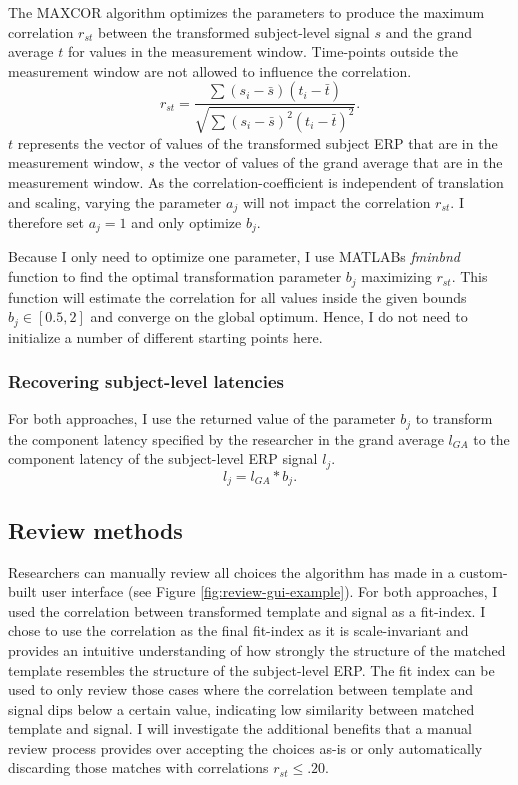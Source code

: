 \documentclass[
  man]{apa7}
\begin{document}
The MAXCOR algorithm optimizes the parameters to produce the maximum correlation \(r_{st}\) between the transformed subject-level signal \(s\) and the grand average \(t\) for values in the measurement window. Time-points outside the measurement window are not allowed to influence the correlation.
\[r_{st} = \frac{\sum(s_i - \bar{s})(t_{i} - \bar{t})}{\sqrt{\sum(s_i - \bar{s})^2(t_{i} - \bar{t})^2}}.\]
\(t\) represents the vector of values of the transformed subject ERP that are in the measurement window, \(s\) the vector of values of the grand average that are in the measurement window. As the correlation-coefficient is independent of translation and scaling, varying the parameter \(a_j\) will not impact the correlation \(r_{st}\). I therefore set \(a_j = 1\) and only optimize \(b_j\).

Because I only need to optimize one parameter, I use MATLABs \emph{fminbnd} function to find the optimal transformation parameter \(b_j\) maximizing \(r_{st}\). This function will estimate the correlation for all values inside the given bounds \(b_j \in [0.5, 2]\) and converge on the global optimum. Hence, I do not need to initialize a number of different starting points here.

\hypertarget{recovering-subject-level-latencies}{%
\subsubsection{Recovering subject-level latencies}\label{recovering-subject-level-latencies}}

For both approaches, I use the returned value of the parameter \(b_j\) to transform the component latency specified by the researcher in the grand average \(l_{GA}\) to the component latency of the subject-level ERP signal \(l_j\).
\[ l_j = l_{GA} * b_j.\]

\hypertarget{review-methods}{%
\subsection{Review methods}\label{review-methods}}

Researchers can manually review all choices the algorithm has made in a custom-built user interface (see Figure \ref{fig:review-gui-example}). For both approaches, I used the correlation between transformed template and signal as a fit-index. I chose to use the correlation as the final fit-index as it is scale-invariant and provides an intuitive understanding of how strongly the structure of the matched template resembles the structure of the subject-level ERP. The fit index can be used to only review those cases where the correlation between template and signal dips below a certain value, indicating low similarity between matched template and signal. I will investigate the additional benefits that a manual review process provides over accepting the choices as-is or only automatically discarding those matches with correlations \(r_{st} \le .20\).
\end{document}

